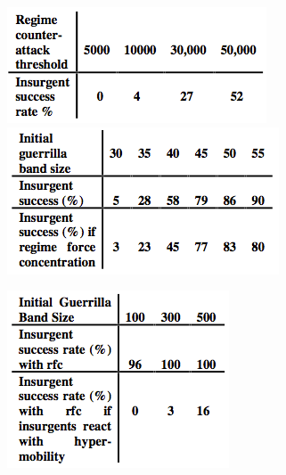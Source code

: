 \documentclass{article}
\begin{document}
\begin{center}
\begin{figure}[H]
\begin{minipage}[H]{0.4\linewidth}
	\centering
	\includegraphics[width=\linewidth]{../ressources/iruba_counter_attack}
\end{minipage}
\hfill
\begin{minipage}[H]{0.4\linewidth}
	\centering
	\includegraphics[width=\linewidth]{../ressources/iruba_force_concentration}
\end{minipage}
\end{figure}
\begin{figure}[H]
\begin{minipage}[H]{0.4\linewidth}
	\centering
	\includegraphics[width=0.9\linewidth]{../ressources/iruba_hyper_mobility}

\end{minipage}
\end{figure}
\end{center}
\end{document}
